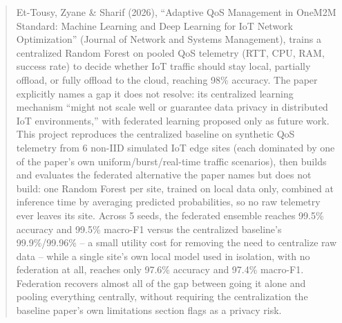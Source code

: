 \begin{abstract}
Et-Tousy, Zyane \& Sharif (2026), ``Adaptive QoS Management in OneM2M Standard: Machine Learning and Deep Learning for IoT Network Optimization'' (Journal of Network and Systems Management), trains a centralized Random Forest on pooled QoS telemetry (RTT, CPU, RAM, success rate) to decide whether IoT traffic should stay local, partially offload, or fully offload to the cloud, reaching 98\% accuracy. The paper explicitly names a gap it does not resolve: its centralized learning mechanism ``might not scale well or guarantee data privacy in distributed IoT environments,'' with federated learning proposed only as future work. This project reproduces the centralized baseline on synthetic QoS telemetry from 6 non-IID simulated IoT edge sites (each dominated by one of the paper's own uniform/burst/real-time traffic scenarios), then builds and evaluates the federated alternative the paper names but does not build: one Random Forest per site, trained on local data only, combined at inference time by averaging predicted probabilities, so no raw telemetry ever leaves its site. Across 5 seeds, the federated ensemble reaches 99.5\% accuracy and 99.5\% macro-F1 versus the centralized baseline's 99.9\%/99.96\% -- a small utility cost for removing the need to centralize raw data -- while a single site's own local model used in isolation, with no federation at all, reaches only 97.6\% accuracy and 97.4\% macro-F1. Federation recovers almost all of the gap between going it alone and pooling everything centrally, without requiring the centralization the baseline paper's own limitations section flags as a privacy risk.
\end{abstract}
